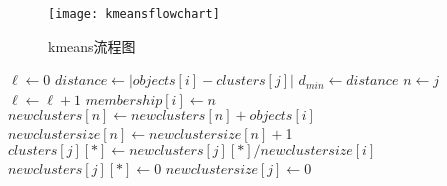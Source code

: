     \begin{figure}[htbp]
    \centering
    \texttt{[image: kmeansflowchart]}
    \caption{kmeans流程图}\label{fig:kmeans2}
    \vspace{\baselineskip}
    \end{figure}

\begin{algorithmic}


    \State $\ell \gets 0$
        \State  $   distance \gets |objects[i]-clusters[j]|$ 
        \State  $ d_{min} \gets distance $
                \State $n \gets j$
            \EndIf    
        \EndFor
            \State $\ell \gets \ell + 1$
            \State $ membership[i] \gets n$
        \EndIf
       \State $newclusters[n] \gets newclusters[n]+objects[i] $
       \State $newclustersize[n] \gets  newclustersize[n]+$1
    \EndFor
       \State $clusters[j][*] \gets newclusters[j][*]/newclustersize[i] $
       \State $newclusters[j][*] \gets 0 $
       \State $newclustersize[j] \gets 0$
    \EndFor 
    \EndWhile
\end{algorithmic}
